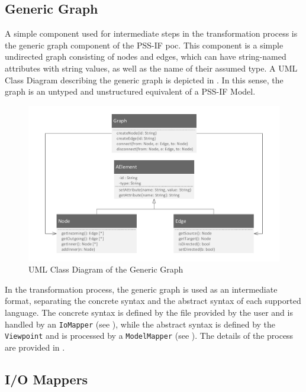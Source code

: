 \subsection{Generic Graph}

A simple component used for intermediate steps in the transformation process is the generic graph component of the PSS-IF \gls{poc}. This component is a simple undirected graph consisting of nodes and edges, which can have string-named attributes with string values, as well as the name of their assumed type. A UML Class Diagram describing the generic graph is depicted in . In this sense, the graph is an untyped and unstructured equivalent of a PSS-IF Model.

\begin{figure}[h]
\centering
\includegraphics[scale=0.75]{figures/graph.pdf}
\caption{UML Class Diagram of the Generic Graph}
\label{fig:genericgraph}
\end{figure}

In the transformation process, the generic graph is used as an intermediate format, separating the concrete syntax and the abstract syntax of each supported language. The concrete syntax is defined by the file provided by the user and is handled by an \texttt{IoMapper} (see ), while the abstract syntax is defined by the \texttt{Viewpoint} and is processed by a \texttt{ModelMapper} (see ). The details of the process are provided in .

\subsection{I/O Mappers}
\label{sec:impl:comp:io}

